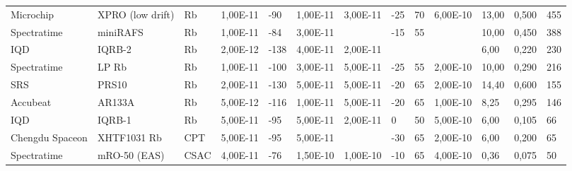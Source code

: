 \begin{table}[H]
\begin{tabular}{ll|lllllllllll}
        Microchip       & XPRO (low drift) & Rb            & 1,00E-11      & -90                    & 1,00E-11       & 3,00E-11         & -25                    & 70                     & 6,00E-10        & 13,00          & 0,500           & 455                     \\
        Spectratime     & miniRAFS         & Rb            & 1,00E-11      & -84                    & 3,00E-11       & ~                & -15                    & 55                     & ~               & 10,00          & 0,450           & 388                     \\
        IQD             & IQRB-2           & Rb            & 2,00E-12      & -138                   & 4,00E-11       & 2,00E-11         & ~                      & ~                      & ~               & 6,00           & 0,220           & 230                     \\
        Spectratime     & LP Rb            & Rb            & 1,00E-11      & -100                   & 3,00E-11       & 5,00E-11         & -25                    & 55                     & 2,00E-10        & 10,00          & 0,290           & 216                     \\
        SRS             & PRS10            & Rb            & 2,00E-11      & -130                   & 5,00E-11       & 5,00E-11         & -20                    & 65                     & 2,00E-10        & 14,40          & 0,600           & 155                     \\
        Accubeat        & AR133A           & Rb            & 5,00E-12      & -116                   & 1,00E-11       & 5,00E-11         & -20                    & 65                     & 1,00E-10        & 8,25           & 0,295           & 146                     \\
        IQD             & IQRB-1           & Rb            & 5,00E-11      & -95                    & 5,00E-11       & 2,00E-11         & 0                      & 50                     & 5,00E-10        & 6,00           & 0,105           & 66                      \\
        Chengdu Spaceon & XHTF1031 Rb      & CPT           & 5,00E-11      & -95                    & 5,00E-11       & ~                & -30                    & 65                     & 2,00E-10        & 6,00           & 0,200           & 65                      \\
        Spectratime     & mRO-50 (EAS)     & CSAC          & 4,00E-11      & -76                    & 1,50E-10       & 1,00E-10         & -10                    & 65                     & 4,00E-10        & 0,36           & 0,075           & 50                      \\

\end{tabular}
\end{table}
